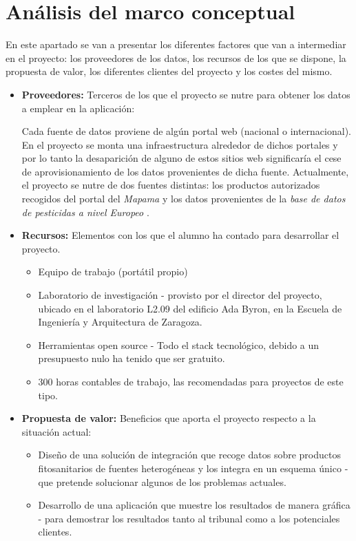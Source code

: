 \section{Análisis del marco conceptual}
En este apartado se van a presentar los diferentes factores que van a intermediar en el proyecto: los proveedores de los datos, los recursos de los que se dispone, la propuesta de valor, los diferentes clientes del proyecto y los costes del mismo. \par
\begin{itemize}
\item \textbf{Proveedores:} Terceros de los que el proyecto se nutre para obtener los datos a emplear en la aplicación: \par Cada fuente de datos proviene de algún portal web (nacional o internacional). En el proyecto se monta una infraestructura alrededor de dichos portales y por lo tanto la desaparición de alguno de estos sitios web significaría el cese de aprovisionamiento de los datos provenientes de dicha fuente. Actualmente, el proyecto se nutre de dos fuentes distintas: los productos autorizados recogidos del portal del \textit{Mapama} \cite{mapama} y los datos provenientes de la \textit{base de datos de pesticidas a nivel Europeo} \cite{pesticidesdb}.
\item \textbf{Recursos:} Elementos con los que el alumno ha contado para desarrollar el proyecto. 
\begin{itemize}
\item Equipo de trabajo (portátil propio)
\item Laboratorio de investigación - provisto por el director del proyecto, ubicado en el laboratorio L2.09 del edificio Ada Byron, en la Escuela de Ingeniería y Arquitectura de Zaragoza.
\item Herramientas open source - Todo el stack tecnológico, debido a un presupuesto nulo ha tenido que ser gratuito.
\item 300 horas contables de trabajo, las recomendadas para proyectos de este tipo.
\end{itemize}
\item \textbf{Propuesta de valor:} Beneficios que aporta el proyecto respecto a la situación actual:
\begin{itemize}
\item Diseño de una solución de integración que recoge datos sobre productos fitosanitarios de fuentes heterogéneas y los integra en un esquema único - que pretende solucionar algunos de los problemas actuales.
\item Desarrollo de una aplicación que muestre los resultados de manera gráfica - para demostrar los resultados tanto al tribunal como a los potenciales clientes.

\end{itemize}
\end{itemize}
